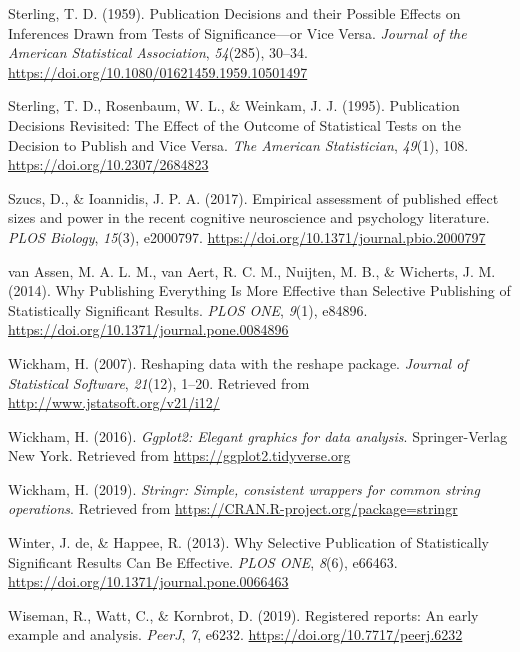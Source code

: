 \documentclass[british,,man,floatsintext]{apa6}
\begin{document}
\leavevmode\hypertarget{ref-Sterling1959}{}%
Sterling, T. D. (1959). Publication Decisions and their Possible Effects on Inferences Drawn from Tests of Significance---or Vice Versa. \emph{Journal of the American Statistical Association}, \emph{54}(285), 30--34. \url{https://doi.org/10.1080/01621459.1959.10501497}

\leavevmode\hypertarget{ref-Sterling1995}{}%
Sterling, T. D., Rosenbaum, W. L., \& Weinkam, J. J. (1995). Publication Decisions Revisited: The Effect of the Outcome of Statistical Tests on the Decision to Publish and Vice Versa. \emph{The American Statistician}, \emph{49}(1), 108. \url{https://doi.org/10.2307/2684823}

\leavevmode\hypertarget{ref-Szucs2017}{}%
Szucs, D., \& Ioannidis, J. P. A. (2017). Empirical assessment of published effect sizes and power in the recent cognitive neuroscience and psychology literature. \emph{PLOS Biology}, \emph{15}(3), e2000797. \url{https://doi.org/10.1371/journal.pbio.2000797}

\leavevmode\hypertarget{ref-vanAssen2014}{}%
van Assen, M. A. L. M., van Aert, R. C. M., Nuijten, M. B., \& Wicherts, J. M. (2014). Why Publishing Everything Is More Effective than Selective Publishing of Statistically Significant Results. \emph{PLOS ONE}, \emph{9}(1), e84896. \url{https://doi.org/10.1371/journal.pone.0084896}

\leavevmode\hypertarget{ref-R-reshape2}{}%
Wickham, H. (2007). Reshaping data with the reshape package. \emph{Journal of Statistical Software}, \emph{21}(12), 1--20. Retrieved from \url{http://www.jstatsoft.org/v21/i12/}

\leavevmode\hypertarget{ref-R-ggplot2}{}%
Wickham, H. (2016). \emph{Ggplot2: Elegant graphics for data analysis}. Springer-Verlag New York. Retrieved from \url{https://ggplot2.tidyverse.org}

\leavevmode\hypertarget{ref-R-stringr}{}%
Wickham, H. (2019). \emph{Stringr: Simple, consistent wrappers for common string operations}. Retrieved from \url{https://CRAN.R-project.org/package=stringr}

\leavevmode\hypertarget{ref-Winter2013}{}%
Winter, J. de, \& Happee, R. (2013). Why Selective Publication of Statistically Significant Results Can Be Effective. \emph{PLOS ONE}, \emph{8}(6), e66463. \url{https://doi.org/10.1371/journal.pone.0066463}

\leavevmode\hypertarget{ref-Wiseman2019}{}%
Wiseman, R., Watt, C., \& Kornbrot, D. (2019). Registered reports: An early example and analysis. \emph{PeerJ}, \emph{7}, e6232. \url{https://doi.org/10.7717/peerj.6232}
\end{document}
